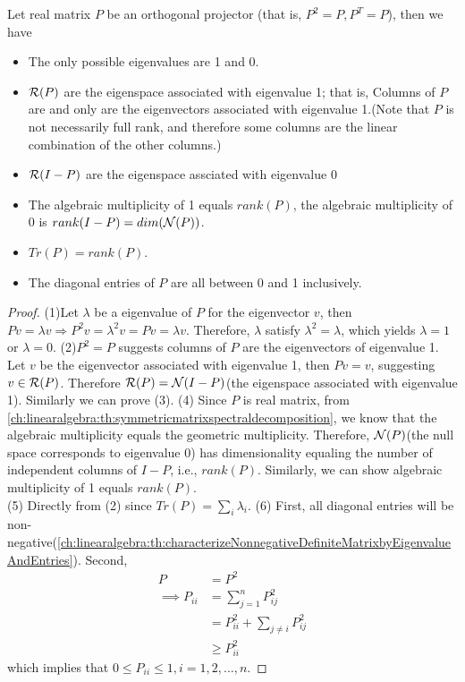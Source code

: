 \begin{refsection}
\begin{theorem}\label{ch:linearalgebra:th:spectralpropertyorthogonalprojector}
Let real matrix $P$ be an orthogonal projector (that is, $P^2=P, P^T = P$), then we have
\begin{itemize}
	\item The only possible eigenvalues are 1 and 0. 
	\item $\mathcal{R}(P)$ are the eigenspace associated with eigenvalue 1; that is, Columns of $P$ are and only are the eigenvectors associated with eigenvalue 1.(Note that $P$ is not necessarily full rank, and therefore some columns are the linear combination of the other columns.) 
	\item $\mathcal{R}(I-P)$ are the eigenspace assciated with eigenvalue 0
	 
	\item The algebraic multiplicity of 1 equals $rank(P)$, the algebraic multiplicity of 0 is $rank(I-P) = dim(\mathcal{N}(P))$.
	\item $Tr(P) = rank(P)$.
	\item The diagonal entries of $P$ are all between 0 and 1 inclusively.
\end{itemize}
\end{theorem}
\begin{proof}
(1)Let $\lambda$ be a eigenvalue of $P$ for the eigenvector $v$, then $Pv=\lambda v \Rightarrow P^2 v = \lambda^2 v = Pv = \lambda v$. Therefore, $\lambda$ satisfy $\lambda^2 = \lambda$, which yields $\lambda = 1$ or $\lambda =0$. 
(2)$P^2 = P$ suggests columns of $P$ are the eigenvectors of eigenvalue 1. Let $v$ be the eigenvector associated with eigenvalue 1, then $Pv = v$, suggesting $v\in \mathcal{R}(P)$. Therefore $\mathcal{R}(P) = \mathcal{N}(I-P)$(the eigenspace associated with eigenvalue 1). Similarly we can prove (3).
(4) Since $P$ is real matrix, from \autoref{ch:linearalgebra:th:symmetricmatrixspectraldecomposition}, we know that the algebraic multiplicity equals the geometric multiplicity. Therefore, $\mathcal{N}(P)$(the null space corresponds to eigenvalue 0) has dimensionality equaling the number of independent columns of $I-P$, i.e., $rank(P)$. Similarly, we can show algebraic multiplicity of 1 equals $rank(P)$.\\
(5) Directly from (2) since $Tr(P) = \sum_{i}\lambda_i$.
(6) First, all diagonal entries will be non-negative(\autoref{ch:linearalgebra:th:characterizeNonnegativeDefiniteMatrixbyEigenvalueAndEntries}). Second, 
\begin{align*}
P &= P^2\\
\implies P_{ii} &= \sum_{j=1}^{n} P_{ij}^2 \\
&= P_{ii}^2 + \sum_{j\neq i} P_{ij}^2 \\
&\geq P_{ii}^2
\end{align*}
which implies that $0\leq P_{ii} \leq 1, i=1,2,...,n.$
\end{proof}



\end{refsection}
